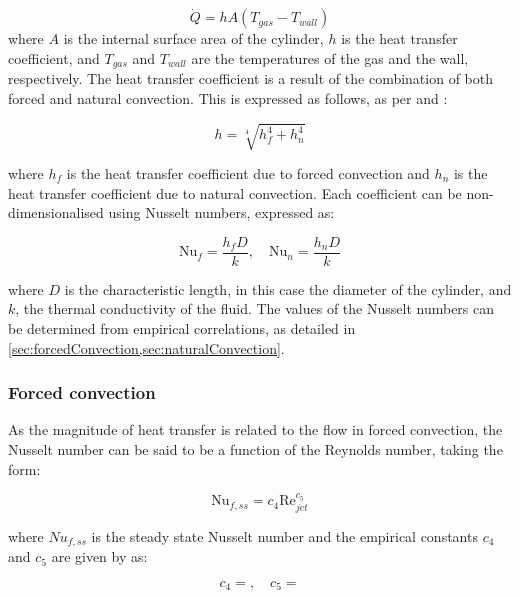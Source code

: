 \begin{equation}
\label{equ:convection}
\dot Q = h A \left( T_{gas} - T_{wall}\right)
\end{equation}
where $A$ is the internal surface area of the cylinder, $h$ is the heat transfer coefficient, and $T_{gas}$ and $T_{wall}$ are the temperatures of the gas and the wall, respectively. The heat transfer coefficient is a result of the combination of both forced and natural convection. This is expressed as follows, as per \cite{Incropera2007} and \cite{Kakac1987}:

\begin{equation}
h = \sqrt[4]{h_f^4 + h_n^4} 
\end{equation}

\noindent where $h_f$ is the heat transfer coefficient due to forced convection and $h_n$ is the heat transfer coefficient due to natural convection. Each coefficient can be non-dimensionalised using Nusselt numbers, expressed as:

\begin{equation}
\text{Nu}_f = \frac{h_f D}{k}, \quad \text{Nu}_n = \frac{h_n D}{k}
\end{equation}

\noindent where $D$ is the characteristic length, in this case the diameter of the cylinder, and $k$, the thermal conductivity of the fluid. The values of the Nusselt numbers can be determined from empirical correlations, as detailed in \cref{sec:forcedConvection,sec:naturalConvection}.

\subsubsection{Forced convection}
\label{sec:forcedConvection}
As the magnitude of heat transfer is related to the flow in forced convection, the Nusselt number can be said to be a function of the Reynolds number, taking the form:

\begin{equation}
\label{equ:nusseltReynolds}
\text{Nu}_{f,ss} = c_4 \text{Re}_{jet} ^{c_5}
\end{equation}

\noindent where ${Nu}_{f,ss}$ is the steady state Nusselt number and the empirical constants $c_4$ and $c_5$ are given by  as:

\begin{equation}
\label{equ:nusseltReynoldsConsts}
c_4 =   ,  \quad c_5 = 
\end{equation}

